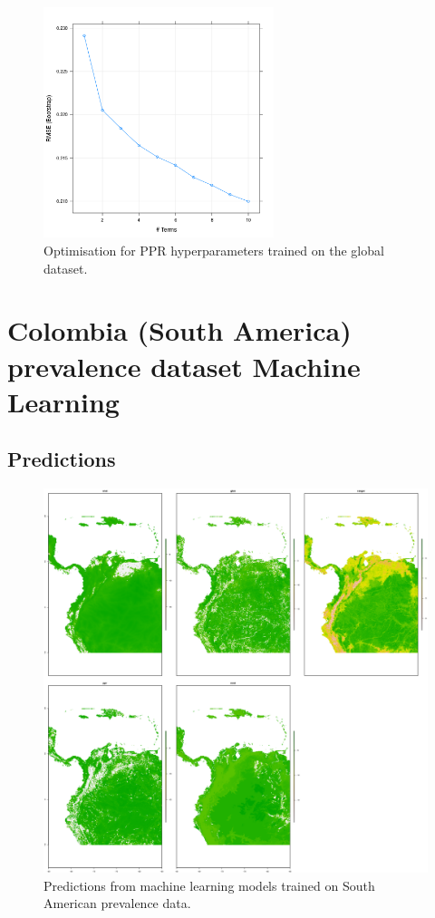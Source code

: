\documentclass[review]{elsarticle}
\begin{document}
\begin{figure}[h!]
  \centering
  \includegraphics[width=0.6\textwidth]{figs/SI/ppropt.png}
\caption{
  Optimisation for PPR hyperparameters trained on the global dataset.
}

\end{figure}




\clearpage
\section{Colombia (South America) prevalence dataset Machine Learning}


\subsection{Predictions}

\begin{figure}[h!]
  \centering
  \includegraphics[width=1\textwidth]{figs/SI/SA_all_ml.png}
\caption{
  Predictions from machine learning models trained on South American prevalence data.
}

\end{figure}
\end{document}
